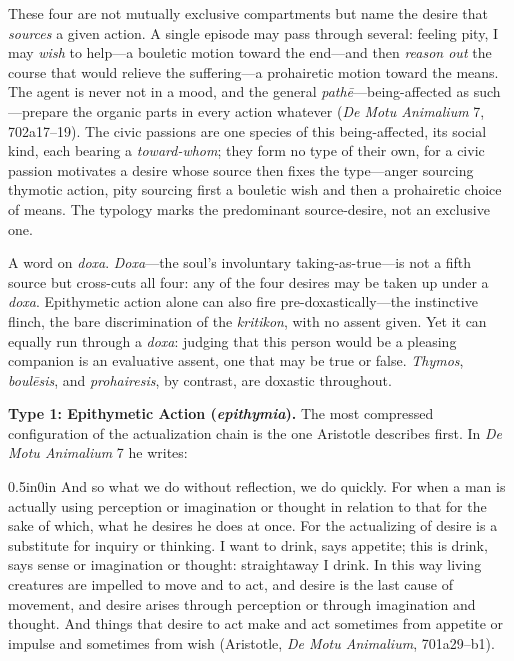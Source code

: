 \documentclass{article}
\begin{document}
These four are not mutually exclusive compartments but name the desire that \textit{sources} a given action. A single episode may pass through several: feeling pity, I may \textit{wish} to help---a bouletic motion toward the end---and then \textit{reason out} the course that would relieve the suffering---a prohairetic motion toward the means. The agent is never not in a mood, and the general \textit{pathē}---being-affected as such---prepare the organic parts in every action whatever (\textit{De Motu Animalium} 7, 702a17--19). The civic passions are one species of this being-affected, its social kind, each bearing a \textit{toward-whom}; they form no type of their own, for a civic passion motivates a desire whose source then fixes the type---anger sourcing thymotic action, pity sourcing first a bouletic wish and then a prohairetic choice of means. The typology marks the predominant source-desire, not an exclusive one.

A word on \textit{doxa}. \textit{Doxa}---the soul's involuntary taking-as-true---is not a fifth source but cross-cuts all four: any of the four desires may be taken up under a \textit{doxa}. Epithymetic action alone can also fire pre-doxastically---the instinctive flinch, the bare discrimination of the \textit{kritikon}, with no assent given. Yet it can equally run through a \textit{doxa}: judging that this person would be a pleasing companion is an evaluative assent, one that may be true or false. \textit{Thymos}, \textit{boulēsis}, and \textit{prohairesis}, by contrast, are doxastic throughout.

\textbf{Type 1: Epithymetic Action (\textit{epithymia}).} The most compressed configuration of the actualization chain is the one Aristotle describes first. In \textit{De Motu Animalium} 7 he writes:

\begin{adjustwidth}{0.5in}{0in}
And so what we do without reflection, we do quickly. For when a man is actually using perception or imagination or thought in relation to that for the sake of which, what he desires he does at once. For the actualizing of desire is a substitute for inquiry or thinking. I want to drink, says appetite; this is drink, says sense or imagination or thought: straightaway I drink. In this way living creatures are impelled to move and to act, and desire is the last cause of movement, and desire arises through perception or through imagination and thought. And things that desire to act make and act sometimes from appetite or impulse and sometimes from wish (Aristotle, \textit{De Motu Animalium}, 701a29--b1).
\end{adjustwidth}
\end{document}
